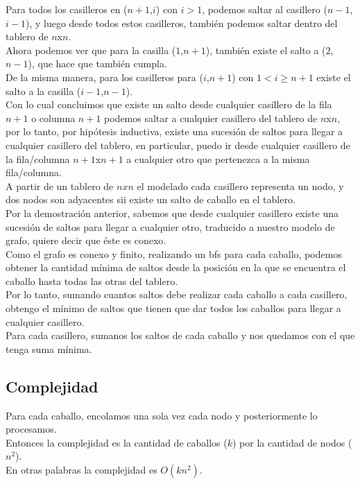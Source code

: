 {{Para todos los casilleros en ($n+1$,$i$) con $i>1$, podemos saltar al casillero ($n-1$,$i-1$), y luego desde todos estos casilleros, también podemos saltar dentro del tablero de $n$x$n$.
\\
Ahora podemos ver que para la casilla ($1$,$n+1$), también existe el salto a ($2$,$n-1$), que hace que también cumpla.
\\
De la misma manera, para los casilleros para ($i$,$n+1$) con $1< i \geq n+1$ existe el salto a la casilla ($i-1$,$n-1$).
\\
Con lo cual concluimos que existe un salto desde cualquier casillero de la fila $n+1$ o columna $n+1$ podemos saltar a cualquier casillero del tablero de $n$x$n$, por lo tanto, por hipótesis inductiva, existe una sucesión de saltos para llegar a cualquier casillero del tablero, en particular, puedo ir desde cualquier casillero de la fila/columna $n+1$x$n+1$ a cualquier otro que pertenezca a la misma fila/columna.
\\
A partir de un tablero de $nxn$ el modelado cada casillero representa un nodo, y dos nodos son adyacentes sii existe un salto de caballo en el tablero.
\\
Por la demostración anterior, sabemos que desde cualquier casillero existe una sucesión de saltos para llegar a cualquier otro, traducido a nuestro modelo de grafo, quiere decir que éste es conexo.
\\
Como el grafo es conexo y finito, realizando un bfs para cada caballo, podemos obtener la cantidad mínima de saltos desde la posición en la que se encuentra el caballo hasta todas las otras del tablero.
\\
Por lo tanto, sumando cuantos saltos debe realizar cada caballo a cada casillero, obtengo el mínimo de saltos que tienen que dar todos los caballos para llegar a cualquier casillero.
\\
Para cada casillero, sumanos los saltos de cada caballo y nos quedamos con el que tenga suma mínima.

\subsection{Complejidad}
Para cada caballo, encolamos una sola vez cada nodo y posteriormente lo procesamos.
\\
Entonces la complejidad es la cantidad de caballos ($k$) por la cantidad de nodos ($n^2$).
\\
En otras palabras la complejidad es $O(kn^2)$.

}}
